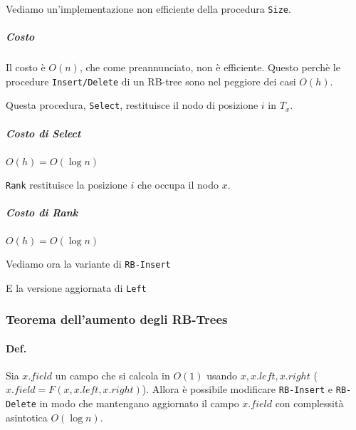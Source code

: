 Vediamo un'implementazione non efficiente della procedura \texttt{Size}.

 

\subparagraph{Costo} Il costo è $O(n)$, che come preannunciato, non è efficiente.
Questo perchè le procedure \texttt{Insert/Delete} di un RB-tree sono nel peggiore dei casi $O(h)$.

\bigskip Questa procedura, \texttt{Select}, restituisce il nodo di posizione $i$
in $T_x$.

 

\subparagraph{Costo di Select} $O(h) = O(\log n)$

\texttt{Rank} restituisce la posizione $i$ che occupa il nodo $x$.



\subparagraph{Costo di Rank} $O(h) = O(\log n)$

\bigskip Vediamo ora la variante di \texttt{RB-Insert} 



E la versione aggiornata di \texttt{Left}



\subsubsection{Teorema dell'aumento degli RB-Trees}

\paragraph{Def.} Sia $x.field$ un campo che si calcola in $O(1)$
usando $x, x.left, x.right$ ($x.field = F(x, x.left, x.right)$).
Allora è possibile modificare \texttt{RB-Insert} e \texttt{RB-Delete}
in modo che mantengano aggiornato il campo $x.field$ con complessità
asintotica $O(\log n)$.

